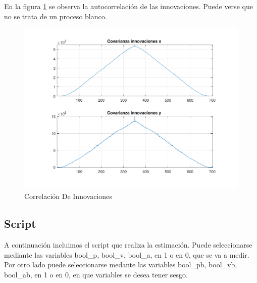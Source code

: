 	En la figura \ref{fig:ej3f_cov} se observa la autocorrelación de las innovaciones. Puede verse que no se trata de un proceso blanco.

	\begin{figure}[H]
		\centering
		\includegraphics[width=1.0\textwidth,keepaspectratio]{Figuras/covinn_ej4f.pdf}
		\caption{Correlación De Innovaciones}
		\label{fig:ej3f_cov}
	\end{figure}
	

\subsection{Script}

	A continuación incluimos el script que realiza la estimación. Puede seleccionarse mediante las variables bool\_p, bool\_v, bool\_a, en 1 o en 0, que se va a medir. Por otro lado puede seleccionarse medante las variables bool\_pb, bool\_vb, bool\_ab, en 1 o en 0, en que variables se desea tener sesgo.
	

